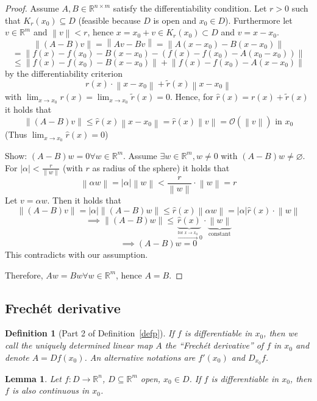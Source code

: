\documentclass{article}
\newtheorem{definition}{Definition}  \numberwithin{definition}{section}
\newtheorem{lemma}{Lemma}  \numberwithin{lemma}{section}
\newcommand{\norm}[1]{\left\|#1\right\|}
\newcommand{\card}[1]{\left|#1\right|}
\begin{document}
\begin{proof}
  Assume $A, B \in \mathbb R^{n\times m}$ satisfy the differentiability condition.
  Let $r > 0$ such that $K_r(x_0) \subseteq D$ (feasible because $D$ is open and $x_0 \in D$).
  Furthermore let $v \in \mathbb R^m$ and $\norm{v} < r$, hence $x = x_0 + v \in K_r(x_0) \subset D$
  and $v = x - x_0$.
  \[ \norm{(A - B) v} = \norm{Av - Bv} = \norm{A(x - x_0) - B(x - x_0)} \]
  \[ = \norm{f(x) - f(x_0) - B(x - x_0) - (f(x) - f(x_0) - A(x_0 - x_0))} \]
  \[ \leq \norm{f(x) - f(x_0) - B(x - x_0)} + \norm{f(x) - f(x_0) - A(x - x_0)} \]
  by the differentiability criterion
  \[ r(x) \cdot \norm{x - x_0} + \tilde r(x) \norm{x - x_0} \]
  with $\lim_{x\to x_0} r(x) = \lim_{x\to x_0} \tilde r(x) = 0$. Hence, for $\hat r(x) = r(x) + \tilde r(x)$ it holds that
  \[ \norm{(A - B) v} \leq \hat r(x) \norm{x - x_0} = \hat r(x) \norm{v} = \mathcal O(\norm{v}) \text{ in } x_0 \]
  (Thus $\lim_{x\to x_0} \hat r(x) = 0$)

  Show: $(A - B)w = 0 \forall w \in \mathbb R^m$. Assume $\exists w \in \mathbb R^m, w \neq 0$ with $(A - B)w \neq \diameter$.
  For $\card{\alpha} < \frac r{\norm{w}}$ (with $r$ as radius of the sphere) it holds that
  \[ \norm{\alpha w} = \card{\alpha} \norm{w} < \frac{r}{\norm{w}} \cdot \norm{w} = r \]
  Let $v = \alpha w$. Then it holds that
  \[ \norm{(A - B) v} = \card{\alpha} \norm{(A - B) w} \leq \hat r(x) \norm{\alpha w} = \card{\alpha} \hat r(x) \cdot \norm{w} \]
  \[ \implies \norm{(A - B) w} \leq \underbrace{\hat r(x)}_{\xrightarrow{\text{for } x \to x_0} 0} \cdot \underbrace{\norm w}_{\text{constant}} \]
  \[ \implies (A - B) w = 0 \]
  This contradicts with our assumption.

  Therefore, $Aw = Bw \forall w \in \mathbb R^m$, hence $A = B$.
\end{proof}

\subsection{Frech\'et derivative}
\begin{definition}[Part 2 of Definition~\ref{defp}] %
  If $f$ is differentiable in $x_0$, then we call the uniquely determined linear map $A$ the \enquote{Frech\'et derivative} of $f$ in $x_0$
  and denote $A = Df(x_0)$. An alternative notations are $f'(x_0)$ and $D_{x_0}f$.
\end{definition}

\begin{lemma} %
  Let $f: D \to \mathbb R^n$, $D \subseteq \mathbb R^m$ open, $x_0 \in D$.
  If $f$ is differentiable in $x_0$, then $f$ is also continuous in $x_0$.
\end{lemma}
\end{document}
